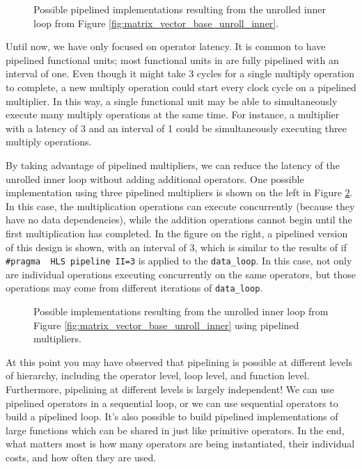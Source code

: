 \begin{figure}
\centering

\caption{Possible pipelined implementations resulting from the unrolled inner loop from Figure \ref{fig:matrix_vector_base_unroll_inner}.}\label{fig:dft_behavior2}
\end{figure}

Until now, we have only focused on operator latency.  It is common to have pipelined functional units; most functional units in \VHLS are fully pipelined with an interval of one. Even though it might take 3 cycles for a single multiply operation to complete, a new multiply operation could start every clock cycle on a pipelined multiplier.  In this way, a single functional unit may be able to simultaneously execute many multiply operations at the same time.  For instance, a multiplier with a latency of 3 and an interval of 1 could be simultaneously executing three multiply operations. 

By taking advantage of pipelined multipliers, we can reduce the latency of the unrolled inner loop without adding additional operators.  One possible implementation using three pipelined multipliers is shown on the left in Figure \ref{fig:dft_behavior_pipelined}.  In this case, the multiplication operations can execute concurrently (because they have no data dependencies), while the addition operations cannot begin until the first multiplication has completed.  In the figure on the right, a pipelined version of this design is shown, with an interval of 3, which is similar to the results of \VHLS if \lstinline|#pragma  HLS pipeline II=3| is applied to the \lstinline|data_loop|.  In this case, not only are individual operations executing concurrently on the same operators, but those operations may come from different iterations of \lstinline|data_loop|.  

\begin{figure}
\centering

\caption{Possible implementations resulting from the unrolled inner loop from Figure \ref{fig:matrix_vector_base_unroll_inner} using pipelined multipliers.}\label{fig:dft_behavior_pipelined}
\end{figure}

At this point you may have observed that pipelining is possible at different levels of hierarchy, including the operator level, loop level, and function level.  Furthermore, pipelining at different levels is largely independent!  We can use pipelined operators in a sequential loop, or we can use sequential operators to build a pipelined loop.  It's also possible to build pipelined implementations of large functions which can be shared in \VHLS just like primitive operators.  In the end, what matters most is how many operators are being instantiated, their individual costs, and how often they are used.

